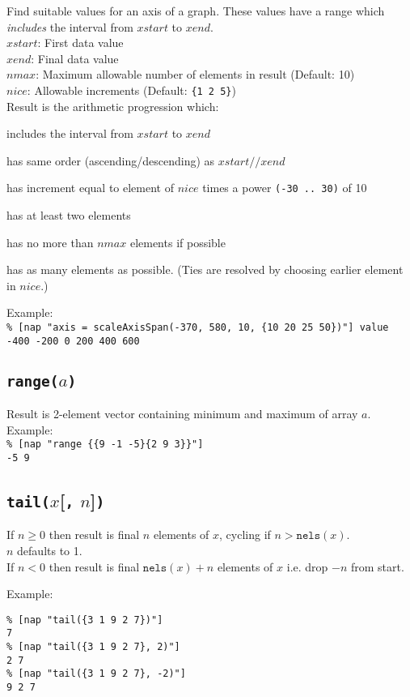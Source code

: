 Find suitable values for an axis of a graph.
These values have a range which \emph{includes}
the interval from $\mathit{xstart}$ to $\mathit{xend}$.
  \\
  $\mathit{xstart}$: First data value
  \\
  $\mathit{xend}$: Final data value
  \\
  $\mathit{nmax}$: Maximum allowable number of elements in result (Default: 10)
  \\
  $\mathit{nice}$: Allowable increments (Default: \texttt{\{1 2 5\}})
  \\Result is the arithmetic progression which:
  \begin{bullets}
    \item includes the interval from $\mathit{xstart}$ to $\mathit{xend}$
    \item has same order (ascending/descending) as $\mathit{xstart} \texttt{//} \mathit{xend}$
    \item has increment equal to element of $\mathit{nice}$ times a power \texttt{(-30 .. 30)} of 10
    \item has at least two elements
    \item has no more than $\mathit{nmax}$ elements if possible
    \item has as many elements as possible.
	(Ties are resolved by choosing earlier element in 
    $\mathit{nice}$.)
  \end{bullets}

Example:
  \\
  \texttt{\% [nap "axis = scaleAxisSpan(-370, 580, 10, \{10 20 25
  50\})"] value
  \\-400 -200 0 200 400 600}

\subsection{\texttt{range(}$a$\texttt{)}}
    \label{nap-function-lib-range}

Result is 2-element vector containing minimum and maximum of
  array 
  $a$.
  \\Example:
  \\
  \texttt{\% [nap "range \{\{9 -1 -5\}\{2 9 3\}\}"]
  \\-5 9}

\subsection{\texttt{tail(}$x$[\texttt{,} $n$]\texttt{)}}
    \label{nap-function-lib-tail}

If $n \ge 0$ then result is final $n$ elements of $x$, cycling if $n > \texttt{nels}(x)$.
\\
$n$ defaults to 1.
\\
If $n < 0$ then result is final $\texttt{nels}(x)+n$ elements of $x$
i.e. drop $-n$ from start.

Example:
\begin{verbatim}
% [nap "tail({3 1 9 2 7})"]
7
% [nap "tail({3 1 9 2 7}, 2)"]
2 7
% [nap "tail({3 1 9 2 7}, -2)"]
9 2 7
\end{verbatim}

